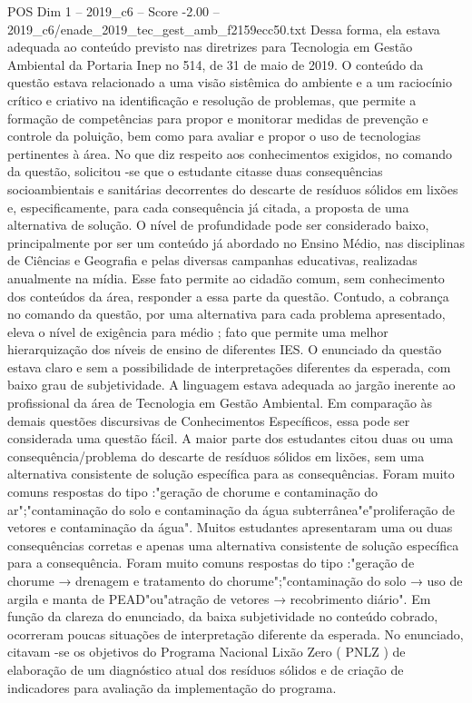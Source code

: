 \begin{textsample}{POS Dim 1 – 2019\_c6 – Score -2.00 – 2019\_c6/enade\_2019\_tec\_gest\_amb\_f2159ecc50.txt}
Dessa forma, ela estava adequada ao conteúdo previsto nas diretrizes para Tecnologia em Gestão Ambiental da Portaria Inep no 514, de 31 de maio de 2019.
O conteúdo da questão estava relacionado a uma visão sistêmica do ambiente e a um raciocínio crítico e criativo na identificação e resolução de problemas, que permite a formação de competências para propor e monitorar medidas de prevenção e controle da poluição, bem como para avaliar e propor o uso de tecnologias pertinentes à área.
No que diz respeito aos conhecimentos exigidos, no comando da questão, solicitou -se que o estudante citasse duas consequências socioambientais e sanitárias decorrentes do descarte de resíduos sólidos em lixões e, especificamente, para cada consequência já citada, a proposta de uma alternativa de solução.
O nível de profundidade pode ser considerado baixo, principalmente por ser um conteúdo já abordado no Ensino Médio, nas disciplinas de Ciências e Geografia e pelas diversas campanhas educativas, realizadas anualmente na mídia.
Esse fato permite ao cidadão comum, sem conhecimento dos conteúdos da área, responder a essa parte da questão.
Contudo, a cobrança no comando da questão, por uma alternativa para cada problema apresentado, eleva o nível de exigência para médio ; fato que permite uma melhor hierarquização dos níveis de ensino de diferentes IES.
O enunciado da questão estava claro e sem a possibilidade de interpretações diferentes da esperada, com baixo grau de subjetividade.
A linguagem estava adequada ao jargão inerente ao profissional da área de Tecnologia em Gestão Ambiental.
Em comparação às demais questões discursivas de Conhecimentos Específicos, essa pode ser considerada uma questão fácil.
A maior parte dos estudantes citou duas ou uma consequência/problema do descarte de resíduos sólidos em lixões, sem uma alternativa consistente de solução específica para as consequências.
Foram muito comuns respostas do tipo :"geração de chorume e contaminação do ar";"contaminação do solo e contaminação da água subterrânea"e"proliferação de vetores e contaminação da água".
Muitos estudantes apresentaram uma ou duas consequências corretas e apenas uma alternativa consistente de solução específica para a consequência.
Foram muito comuns respostas do tipo :"geração de chorume → drenagem e tratamento do chorume";"contaminação do solo → uso de argila e manta de PEAD"ou"atração de vetores → recobrimento diário".
Em função da clareza do enunciado, da baixa subjetividade no conteúdo cobrado, ocorreram poucas situações de interpretação diferente da esperada.
No enunciado, citavam -se os objetivos do Programa Nacional Lixão Zero ( PNLZ ) de elaboração de um diagnóstico atual dos resíduos sólidos e de criação de indicadores para avaliação da implementação do programa.

\end{textsample}
